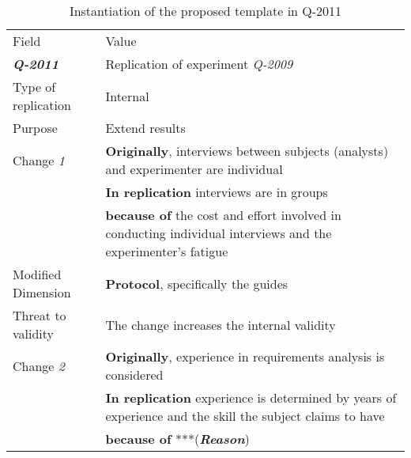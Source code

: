 \begin{table*}[h]
  \caption{Instantiation of the proposed template in Q-2011}
\label{tab:plantEng}
  \centering

\begin{tabularx}{\textwidth}{
  >{\hsize=0.3\hsize}X
  >{\hsize=0.8\hsize}X}
  
    \noalign{\smallskip}\hline\noalign{\smallskip}
  
  Field &  Value  \\ 
  \noalign{\smallskip}\hline\noalign{\smallskip}
  
\textbf {\textit{Q-2011}} &  Replication of experiment \textit{Q-2009 }    \\
Type of replication &  Internal   \\  
Purpose & Extend results   \\  
\hline

    Change \textit{1}   & \textbf{Originally}, interviews between subjects (analysts) and experimenter are individual \\& \textbf{In replication} interviews are in groups   \\& \textbf{because of} the cost and effort involved in conducting individual interviews and the experimenter's fatigue \\
    
    Modified Dimension & 
    \textbf{Protocol}, specifically the guides \\   
    Threat to validity & The change increases the internal validity  \\  \hline
  
    Change \textit{2}   & \textbf{Originally}, experience in requirements analysis is considered \\& \textbf{In replication} experience is determined by years of experience and the skill the subject claims to have  \\
    & \textbf{because of} ***(\textbf{\textit{Reason}})\\


\end{tabularx}
\end{table*}
